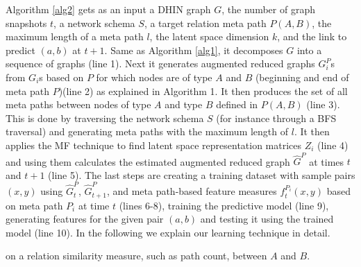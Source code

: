 Algorithm \ref{alg2} gets as an input a DHIN graph $G$, the number of graph snapshots $t$, a network schema $S$, a target relation meta path $P(A,B)$, the maximum length of a meta path $l$, the latent space dimension $k$, and the link to predict $(a,b)$ at $t+1$. Same as Algorithm \ref{alg1}, it decomposes $G$ into a sequence of graphs (line 1). Next it generates augmented reduced graphs $G^P_i$s from $G_i$s based on $P$ for which nodes are of type $A$ and $B$ (beginning and end of meta path $P$)(line 2) as explained in Algorithm 1. It then produces the set of all meta paths between nodes of type $A$ and type $B$ defined in $P(A,B)$ (line 3). This is done by traversing the network schema $S$ (for instance through a BFS traversal) and generating meta paths with the maximum length of $l$. It then applies the MF technique \cite{Zhu2016} to find latent space representation matrices $Z_i$ (line 4) and using them calculates the estimated augmented reduced graph $\hat{G}^{P}$ at times $t$ and $t+1$ (line 5). The last steps are creating a training dataset with sample pairs $(x,y)$ using $\hat{G}^{P}_{t}$, $\hat{G}^{P}_{t+1}$, and meta path-based feature measures $f^{P_i}_t(x,y)$ based on meta path $P_i$ at time $t$ (lines 6-8), training the predictive model (line 9), generating features for the given pair $(a,b)$ and testing it using the trained model (line 10). In the following we explain our learning technique in detail.

on a relation similarity measure, such as path count, between $A$ and $B$.  








